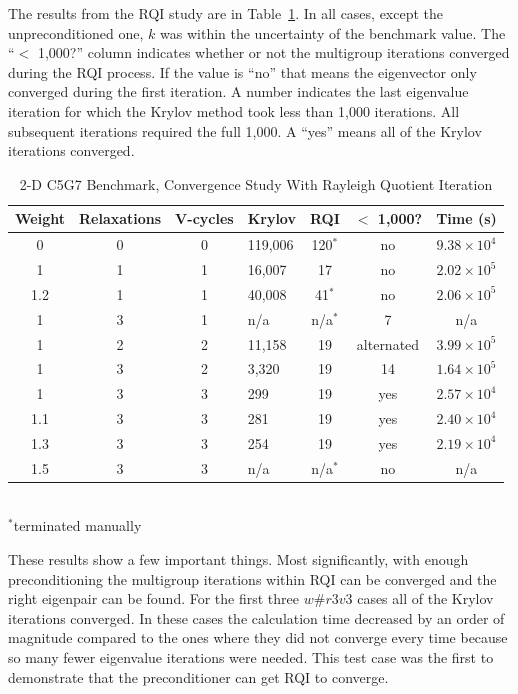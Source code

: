 The results from the RQI study are in Table~\ref{table:2-D c5g7 rqi}. In all cases, except the unpreconditioned one, $k$ was within the uncertainty of the benchmark value. The ``$<$ 1,000?'' column indicates whether or not the multigroup iterations converged during the RQI process. If the value is ``no'' that means the eigenvector only converged during the first iteration. A number indicates the last eigenvalue iteration for which the Krylov method took less than 1,000 iterations. All subsequent iterations required the full 1,000. A ``yes'' means all of the Krylov iterations converged.
%
\begin{table}[!h]
\caption{2-D C5G7 Benchmark, Convergence Study With Rayleigh Quotient Iteration}
\begin{center}
\begin{tabular}{c c c l c c c}
\hline
Weight & Relaxations & V-cycles & Krylov & RQI & $<$ 1,000? & Time (s) \\[0.5ex]
\hline
0    & 0 & 0 & 119,006 & 120$^{*}$ & no & $9.38 \times 10^{4}$ \\
1    & 1 & 1 & 16,007   & 17            & no & $2.02 \times 10^{5}$ \\
1.2 & 1 & 1 & 40,008   & 41$^{*}$   & no & $2.06 \times 10^{5}$ \\
1    & 3 & 1 & n/a         & n/a$^{*}$  & 7   & n/a \\
1    & 2 & 2 & 11,158   & 19            & alternated & $3.99 \times 10^{5}$ \\
1    & 3 & 2 & 3,320     & 19            & 14 & $1.64 \times 10^{5}$ \\
\hline
1    & 3 & 3 & 299        & 19            & yes & $2.57 \times 10^{4}$ \\
1.1 & 3 & 3 & 281        & 19            & yes & $2.40 \times 10^{4}$ \\
1.3 & 3 & 3 & 254        & 19            & yes & $2.19 \times 10^{4}$ \\
1.5 & 3 & 3 & n/a         & n/a$^{*}$ & no & n/a \\
\hline 
\end{tabular} \\
$^{*}$terminated manually
\end{center}
\label{table:2-D c5g7 rqi}
\end{table}
%

These results show a few important things. Most significantly, with enough preconditioning the multigroup iterations within RQI can be converged and the right eigenpair can be found. For the first three $w\#r3v3$ cases all of the Krylov iterations converged. In these cases the calculation time decreased by an order of magnitude compared to the ones where they did not converge every time because so many fewer eigenvalue iterations were needed. This test case was the first to demonstrate that the preconditioner can get RQI to converge. 

